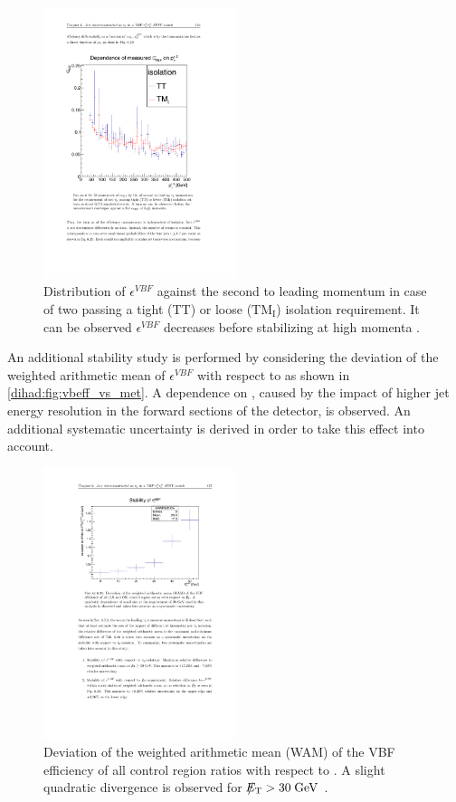  \begin{figure}[!h]
	\centering
	\includegraphics[width=0.5\textwidth]{analysis/pics/vbeff_vs_tauiso.pdf}
	\caption{Distribution of $\epsilon^{VBF}$ against the second to leading \hadtau momentum in case of two \hadtau passing a tight (TT) or loose ($\text{TM}_{\text{I}}$) isolation requirement. It can be observed $\epsilon^{VBF}$ decreases before stabilizing at high momenta \cite{bib:phdthesis:denis}.}
	\label{dihad:fig:vbeff_vs_tauiso}
\end{figure}

An additional stability study is performed by considering the deviation of the weighted arithmetic mean of $\epsilon^{VBF}$ with respect to \met as shown in \autoref{dihad:fig:vbeff_vs_met}. A dependence on \met, caused by the impact of higher jet energy resolution in the forward sections of the detector, is observed. An additional systematic uncertainty is derived in order to take this effect into account.

\begin{figure}[!h]
	\centering
	\includegraphics[width=0.5\textwidth]{analysis/pics/vbeff_vs_met.pdf}
	\caption{Deviation of the weighted arithmetic mean (WAM) of the VBF efficiency of all control region ratios with respect to \met. A slight quadratic divergence is observed for $\slash\mkern-12mu{E}_{\text{T}} > 30\;\text{Ge}\kern-0.06667em\text{V}$ \cite{bib:phdthesis:denis}.}
	\label{dihad:fig:vbeff_vs_met}
\end{figure}
 
